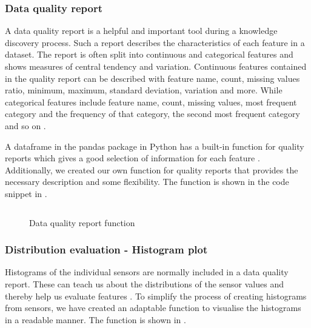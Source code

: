 \documentclass[english, a4paper]{report}
\begin{document}
{{{            \subsubsection{Data quality report}\label{dataQualityReport}
                    {
                    A data quality report is a helpful and important tool during a knowledge discovery process. Such a report describes the characteristics of each feature in a dataset. The report is often split into continuous and categorical features and shows measures of central tendency and variation. Continuous features contained in the quality report can be described with feature name, count, missing values ratio, minimum, maximum, standard deviation, variation and more. While categorical features include feature name, count, missing values, most frequent category and the frequency of that category, the second most frequent category and so on \cite{mlKelleher}.
                    \par
                    A dataframe in the pandas package in Python has a built-in function for quality reports which gives a good selection of information for each feature \cite{pythonDA}. Additionally, we created our own function for quality reports that provides the necessary description and some flexibility. The function is shown in the code snippet in .
                    
                    \begin{figure}[H]
                        \centering {} \inputminted{python}{thesis/Code/DataQualityReport.py}
                        \caption{Data quality report function}
                        \label{fig:DataQualityReportCode}
                    \end{figure}
            }
            
            \subsubsection{Distribution evaluation - Histogram plot}
            {
                Histograms of the individual sensors are normally included in a data quality report. These can teach us about the distributions of the sensor values and thereby help us evaluate features \cite{mlKelleher}. To simplify the process of creating histograms from sensors, we have created an adaptable function to visualise the histograms in a readable manner. The function is shown in .
                
}}}}
\end{document}
